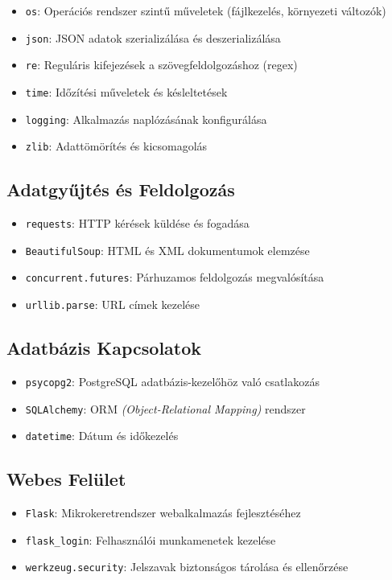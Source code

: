 \documentclass[12pt]{article}
\begin{document}
\begin{itemize}
    \item \texttt{os}: Operációs rendszer szintű műveletek (fájlkezelés, környezeti változók)
    \item \texttt{json}: JSON adatok szerializálása és deszerializálása
    \item \texttt{re}: Reguláris kifejezések a szövegfeldolgozáshoz (regex)
    \item \texttt{time}: Időzítési műveletek és késleltetések
    \item \texttt{logging}: Alkalmazás naplózásának konfigurálása
    \item \texttt{zlib}: Adattömörítés és kicsomagolás
\end{itemize}

\subsection{Adatgyűjtés és Feldolgozás}

\begin{itemize}
    \item \texttt{requests}: HTTP kérések küldése és fogadása
    \item \texttt{BeautifulSoup}: HTML és XML dokumentumok elemzése
    \item \texttt{concurrent.futures}: Párhuzamos feldolgozás megvalósítása
    \item \texttt{urllib.parse}: URL címek kezelése
\end{itemize}

\subsection{Adatbázis Kapcsolatok}

\begin{itemize}
    \item \texttt{psycopg2}: PostgreSQL adatbázis-kezelőhöz való csatlakozás
    \item \texttt{SQLAlchemy}: ORM \textit{(Object-Relational Mapping)} rendszer
    \item \texttt{datetime}: Dátum és időkezelés
\end{itemize}

\subsection{Webes Felület}

\begin{itemize}
    \item \texttt{Flask}: Mikrokeretrendszer webalkalmazás fejlesztéséhez
    \item \texttt{flask\_login}: Felhasználói munkamenetek kezelése
    \item \texttt{werkzeug.security}: Jelszavak biztonságos tárolása és ellenőrzése
\end{itemize}
\end{document}
